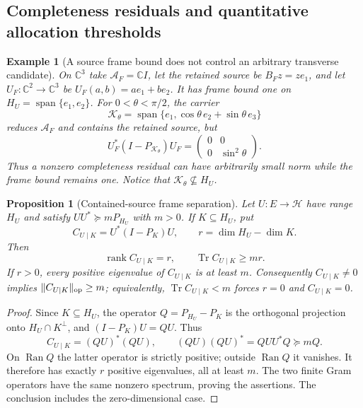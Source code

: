 \documentclass[11pt]{article}
\numberwithin{equation}{section}
\newtheorem{proposition}[theorem]{Proposition}
\newtheorem{example}[theorem]{Example}
\theoremstyle{definition}
\theoremstyle{remark}
\newcommand{\C}{\mathbb C}
\newcommand{\Tr}{\operatorname{Tr}}
\newcommand{\rank}{\operatorname{rank}}
\newcommand{\Ran}{\operatorname{Ran}}
\newcommand{\Span}{\operatorname{span}}
\begin{document}
\subsection{Completeness residuals and quantitative allocation thresholds}
\label{app:source-allocation-certificates}

\begin{example}[A source frame bound does not control an arbitrary transverse candidate]
\label{ex:source-angle-no-gap}
On $\C^3$ take $\mathcal A_F=\C I$, let the retained source be
$B_Fz=ze_1$, and let $U_F:\C^2\to\C^3$ be
$U_F(a,b)=ae_1+be_2$.  It has frame bound one on
$H_U=\Span\{e_1,e_2\}$.  For $0<\theta<\pi/2$, the carrier
\[
 \mathcal K_\theta
 =\Span\{e_1,\cos\theta\,e_2+\sin\theta\,e_3\}
\]
reduces $\mathcal A_F$ and contains the retained source, but
\begin{equation}
 U_F^*(I-P_{\mathcal K_\theta})U_F
 =\begin{pmatrix}0&0\\0&\sin^2\theta\end{pmatrix}.
 \label{eq:source-angle-counterexample}
\end{equation}
Thus a nonzero completeness residual can have arbitrarily small norm while
the frame bound remains one.  Notice that
$\mathcal K_\theta\not\subseteq H_U$.
\end{example}

\begin{proposition}[Contained-source frame separation]
\label{prop:contained-source-frame-gap}
Let $U:E\to\mathcal H$ have range $H_U$ and satisfy
$UU^*\succeq mP_{H_U}$ with $m>0$.  If $K\subseteq H_U$, put
\[
 C_{U\mid K}=U^*(I-P_K)U,
 \qquad r=\dim H_U-\dim K.
\]
Then
\begin{equation}
 \rank C_{U\mid K}=r,\qquad
 \Tr C_{U\mid K}\ge mr.
 \label{eq:contained-source-frame-trace}
\end{equation}
If $r>0$, every positive eigenvalue of $C_{U\mid K}$ is at least $m$.
Consequently $C_{U\mid K}\ne0$ implies
$\|C_{U\mid K}\|_{\rm op}\ge m$; equivalently,
$\Tr C_{U\mid K}<m$ forces $r=0$ and $C_{U\mid K}=0$.
\end{proposition}

\begin{proof}
Since $K\subseteq H_U$, the operator $Q=P_{H_U}-P_K$ is the orthogonal
projection onto $H_U\cap K^\perp$, and $(I-P_K)U=QU$.  Thus
\[
 C_{U\mid K}=(QU)^*(QU),\qquad
 (QU)(QU)^*=QUU^*Q\succeq mQ.
\]
On $\Ran Q$ the latter operator is strictly positive; outside $\Ran Q$ it
vanishes.  It therefore has exactly $r$ positive eigenvalues, all at least
$m$.  The two finite Gram operators have the same nonzero spectrum, proving
the assertions.  The conclusion includes the zero-dimensional case.
\end{proof}
\end{document}
